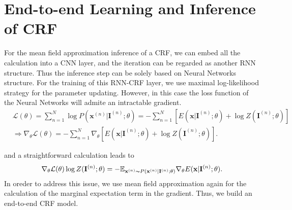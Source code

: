 \documentclass{article}
\numberwithin{equation}{section}
\newcommand{\1}{\boldsymbol{1}}
\begin{document}
\section{End-to-end Learning and Inference of CRF}
For the mean field approximation inference of a CRF, we can embed all the calculation into a CNN layer,
and the iteration can be regarded as another RNN structure. Thus the inference step can be solely based on 
Neural Networks structure.
For the training of this RNN-CRF layer, we use maximal log-likelihood strategy for the parameter updating. 
However, in this case the loss function of the Neural Networks will admite an intractable gradient.
\begin{align}
	&\mathcal{L}(\theta) = \sum_{n=1}^{N} \log P(\mathbf{x}^{(n)}|\mathbf{I}^{(n)}; \theta) = - \sum_{n=1}^{N} [E(\mathbf{x}|\mathbf{I}^{(n)};\theta) + \log Z(\mathbf{I}^{(n)}; \theta)] \\
	& \Rightarrow \nabla_{\theta} \mathcal{L}(\theta) = - \sum_{n=1}^{N} \nabla_{\theta}  [E(\mathbf{x}|\mathbf{I}^{(n)};\theta) + \log Z(\mathbf{I}^{(n)}; \theta)].
      \end{align}
  
      and a straightforward calculation leads to 
      \[\nabla_{\theta} \mathcal{L}(\theta) \log Z(\mathbf{I}^{(n)}; \theta) = - \mathbb{E}_{\mathbf{x}^{(n)}\thicksim P(\mathbf{x}^{(n)}|\mathbf{I}^{(n)};\theta)} \nabla_{\theta}E(\mathbf{x}|\mathbf{I}^{(n)};\theta). \]
In oreder to address this issue, we use mean field approximation again for the calculation of the marginal expectation term in the gradient. Thus, we build an end-to-end CRF model.
\end{document}
